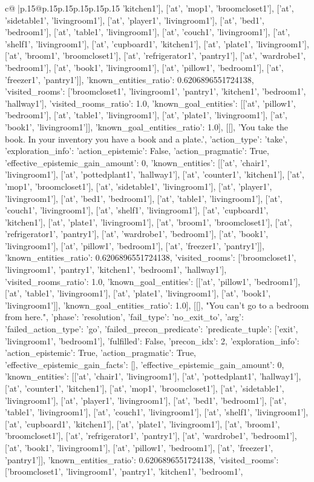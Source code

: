 \documentclass{article}
\begin{document}
{\begin{supertabular}{c@{$\;$}|p{.15\linewidth}@{}p{.15\linewidth}p{.15\linewidth}p{.15\linewidth}p{.15\linewidth}p{.15\linewidth}}
{{{'kitchen1'], ['at', 'mop1', 'broomcloset1'], ['at', 'sidetable1', 'livingroom1'], ['at', 'player1', 'livingroom1'], ['at', 'bed1', 'bedroom1'], ['at', 'table1', 'livingroom1'], ['at', 'couch1', 'livingroom1'], ['at', 'shelf1', 'livingroom1'], ['at', 'cupboard1', 'kitchen1'], ['at', 'plate1', 'livingroom1'], ['at', 'broom1', 'broomcloset1'], ['at', 'refrigerator1', 'pantry1'], ['at', 'wardrobe1', 'bedroom1'], ['at', 'book1', 'livingroom1'], ['at', 'pillow1', 'bedroom1'], ['at', 'freezer1', 'pantry1']], 'known_entities_ratio': 0.6206896551724138, 'visited_rooms': ['broomcloset1', 'livingroom1', 'pantry1', 'kitchen1', 'bedroom1', 'hallway1'], 'visited_rooms_ratio': 1.0, 'known_goal_entities': [['at', 'pillow1', 'bedroom1'], ['at', 'table1', 'livingroom1'], ['at', 'plate1', 'livingroom1'], ['at', 'book1', 'livingroom1']], 'known_goal_entities_ratio': 1.0}}], [[], 'You take the book. In your inventory you have a book and a plate.', {'action_type': 'take', 'exploration_info': {'action_epistemic': False, 'action_pragmatic': True, 'effective_epistemic_gain_amount': 0, 'known_entities': [['at', 'chair1', 'livingroom1'], ['at', 'pottedplant1', 'hallway1'], ['at', 'counter1', 'kitchen1'], ['at', 'mop1', 'broomcloset1'], ['at', 'sidetable1', 'livingroom1'], ['at', 'player1', 'livingroom1'], ['at', 'bed1', 'bedroom1'], ['at', 'table1', 'livingroom1'], ['at', 'couch1', 'livingroom1'], ['at', 'shelf1', 'livingroom1'], ['at', 'cupboard1', 'kitchen1'], ['at', 'plate1', 'livingroom1'], ['at', 'broom1', 'broomcloset1'], ['at', 'refrigerator1', 'pantry1'], ['at', 'wardrobe1', 'bedroom1'], ['at', 'book1', 'livingroom1'], ['at', 'pillow1', 'bedroom1'], ['at', 'freezer1', 'pantry1']], 'known_entities_ratio': 0.6206896551724138, 'visited_rooms': ['broomcloset1', 'livingroom1', 'pantry1', 'kitchen1', 'bedroom1', 'hallway1'], 'visited_rooms_ratio': 1.0, 'known_goal_entities': [['at', 'pillow1', 'bedroom1'], ['at', 'table1', 'livingroom1'], ['at', 'plate1', 'livingroom1'], ['at', 'book1', 'livingroom1']], 'known_goal_entities_ratio': 1.0}}], [[], "You can't go to a bedroom from here.", {'phase': 'resolution', 'fail_type': 'no_exit_to', 'arg': {'failed_action_type': 'go', 'failed_precon_predicate': {'predicate_tuple': ['exit', 'livingroom1', 'bedroom1'], 'fulfilled': False, 'precon_idx': 2}}, 'exploration_info': {'action_epistemic': True, 'action_pragmatic': True, 'effective_epistemic_gain_facts': [], 'effective_epistemic_gain_amount': 0, 'known_entities': [['at', 'chair1', 'livingroom1'], ['at', 'pottedplant1', 'hallway1'], ['at', 'counter1', 'kitchen1'], ['at', 'mop1', 'broomcloset1'], ['at', 'sidetable1', 'livingroom1'], ['at', 'player1', 'livingroom1'], ['at', 'bed1', 'bedroom1'], ['at', 'table1', 'livingroom1'], ['at', 'couch1', 'livingroom1'], ['at', 'shelf1', 'livingroom1'], ['at', 'cupboard1', 'kitchen1'], ['at', 'plate1', 'livingroom1'], ['at', 'broom1', 'broomcloset1'], ['at', 'refrigerator1', 'pantry1'], ['at', 'wardrobe1', 'bedroom1'], ['at', 'book1', 'livingroom1'], ['at', 'pillow1', 'bedroom1'], ['at', 'freezer1', 'pantry1']], 'known_entities_ratio': 0.6206896551724138, 'visited_rooms': ['broomcloset1', 'livingroom1', 'pantry1', 'kitchen1', 'bedroom1', }}}
\end{supertabular}}
\end{document}
